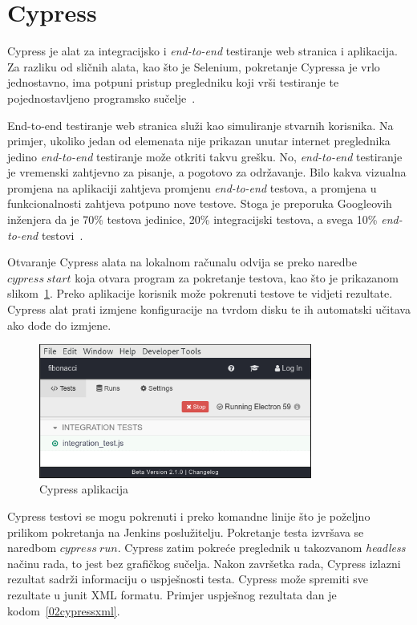 \section{Cypress}
Cypress je alat za integracijsko i \textit{end-to-end} testiranje web stranica i aplikacija. Za
razliku od sličnih alata, kao što je Selenium, pokretanje Cypressa je vrlo jednostavno, ima potpuni
pristup pregledniku koji vrši testiranje te pojednostavljeno programsko sučelje~\citep{Cypress}.

End-to-end testiranje web stranica služi kao simuliranje stvarnih korisnika. Na primjer, ukoliko
jedan od elemenata nije prikazan unutar internet preglednika jedino \textit{end-to-end} testiranje
može otkriti takvu grešku. No, \textit{end-to-end} testiranje je vremenski zahtjevno za pisanje, a
pogotovo za održavanje. Bilo kakva vizualna promjena na aplikaciji zahtjeva promjenu
\textit{end-to-end} testova, a promjena u funkcionalnosti zahtjeva potpuno nove testove. Stoga je
preporuka Googleovih inženjera da je 70\% testova jedinice, 20\% integracijski testova, a svega 10\%
\textit{end-to-end} testovi~\citep{google-2015}.

Otvaranje Cypress alata na lokalnom računalu odvija se preko naredbe $cypress~start$ koja otvara
program za pokretanje testova, kao što je prikazanom slikom~\ref{fig:02cypress}. Preko aplikacije
korisnik može pokrenuti testove te vidjeti rezultate. Cypress alat prati izmjene konfiguracije na
tvrdom disku te ih automatski učitava ako dođe do izmjene.

\begin{figure}[h]
    \centering
    \includegraphics[width=0.8\textwidth]{img/02/cypress.png}
    \caption{Cypress aplikacija}%
    \label{fig:02cypress}
\end{figure}

Cypress testovi se mogu pokrenuti i preko komandne linije što je poželjno prilikom pokretanja na
Jenkins poslužitelju. Pokretanje testa izvršava se naredbom $cypress~run$. Cypress zatim pokreće
preglednik u takozvanom \textit{headless} načinu rada, to jest bez grafičkog sučelja. Nakon
završetka rada, Cypress izlazni rezultat sadrži informaciju o uspješnosti testa. Cypress može
spremiti sve rezultate u junit XML formatu. Primjer uspješnog rezultata dan je
kodom~\ref{02cypressxml}.

